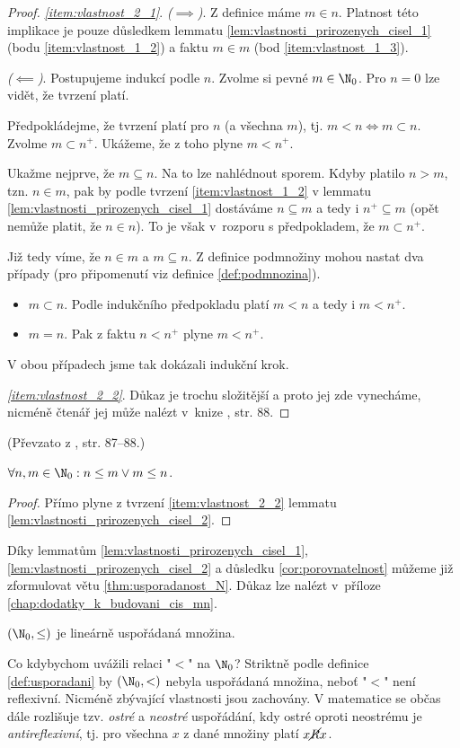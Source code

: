 \begin{proof}
    \textit{\ref{item:vlastnost_2_1}}. \textit{($\implies$)}. Z definice máme $m\in n$. Platnost této implikace je pouze důsledkem lemmatu \ref{lem:vlastnosti_prirozenych_cisel_1} (bodu \ref{item:vlastnost_1_2}) a faktu $m\in m$ (bod \ref{item:vlastnost_1_3}).\par
    \textit{($\impliedby$)}. Postupujeme indukcí podle $n$. Zvolme si pevné $m\in\N_0$. Pro $n=0$ lze vidět, že tvrzení platí.\par
    Předpokládejme, že tvrzení platí pro $n$ (a všechna $m$), tj. $m<n\iff m\subset n$. Zvolme $m\subset n^+$. Ukážeme, že z toho plyne $m<n^+$.\par
    Ukažme nejprve, že $m\subseteq n$. Na to lze nahlédnout sporem. Kdyby platilo $n>m$, tzn. $n\in m$, pak by podle tvrzení \ref{item:vlastnost_1_2} v lemmatu \ref{lem:vlastnosti_prirozenych_cisel_1} dostáváme $n\subseteq m$ a tedy i $n^+\subseteq m$ (opět nemůže platit, že $n\in n$). To je však v~rozporu s předpokladem, že $m\subset n^+$.\par
    Již tedy víme, že $n\in m$ a $m\subseteq n$. Z definice podmnožiny mohou nastat dva případy (pro připomenutí viz definice \ref{def:podmnozina}).
    \begin{itemize}
        \item $m\subset n$. Podle indukčního předpokladu platí $m<n$ a tedy i $m<n^+$.
        \item $m=n$. Pak z faktu $n<n^+$ plyne $m<n^+$.
    \end{itemize}
    V obou případech jsme tak dokázali indukční krok.\par
    \textit{\ref{item:vlastnost_2_2}}. Důkaz je trochu složitější a proto jej zde vynecháme, nicméně čtenář jej může nalézt v~knize \cite{BalcarStepanek1986}, str. 88.
\end{proof}
(Převzato z \cite{BalcarStepanek1986}, str. 87--88.)\par
\begin{corollary}\label{cor:porovnatelnost}
    $\forall n,m\in\N_0: n\leq m \lor m\leq n$.
\end{corollary}
\begin{proof}
    Přímo plyne z tvrzení \ref{item:vlastnost_2_2} lemmatu \ref{lem:vlastnosti_prirozenych_cisel_2}.
\end{proof}
Díky lemmatům \ref{lem:vlastnosti_prirozenych_cisel_1}, \ref{lem:vlastnosti_prirozenych_cisel_2} a důsledku \ref{cor:porovnatelnost} můžeme již zformulovat větu \ref{thm:usporadanost_N}. Důkaz lze nalézt v~příloze \ref{chap:dodatky_k_budovani_cis_mn}.
\begin{theorem}\label{thm:usporadanost_N}
    $(\N_0,\leq)$ je lineárně uspořádaná množina.
\end{theorem}
Co kdybychom uvážili relaci "$<$" na $\N_0$? Striktně podle definice \ref{def:usporadani} by $(\N_0,<)$ nebyla uspořádaná množina, neboť "$<$" není reflexivní. Nicméně zbývající vlastnosti jsou zachovány. V matematice se občas dále rozlišuje tzv. \emph{ostré} a \emph{neostré} uspořádání, kdy ostré oproti neostrému je \emph{antireflexivní}, tj. pro všechna $x$ z dané množiny platí $x\cancel{R}x$.
